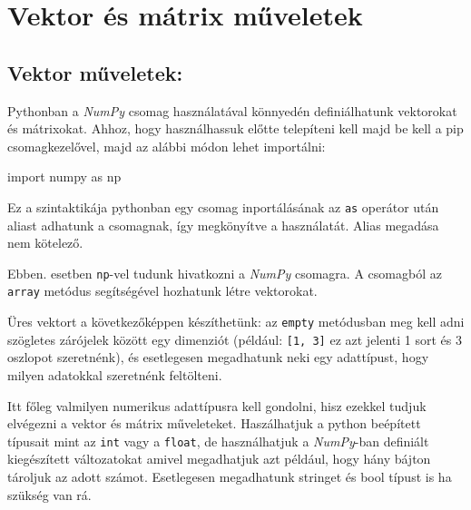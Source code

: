 
\section{Vektor és mátrix
műveletek}\label{vektor-uxe9s-muxe1trix-mux171veletek}

\subsection{Vektor műveletek:}\label{vektor-mux171veletek}

    Pythonban a \emph{NumPy} csomag használatával könnyedén definiálhatunk
vektorokat és mátrixokat. Ahhoz, hogy használhassuk előtte telepíteni
kell majd be kell a pip csomagkezelővel, majd az alábbi módon lehet
importálni:

\begin{python}
import numpy as np
\end{python}

    Ez a szintaktikája pythonban egy csomag inportálásának az \texttt{as}
operátor után aliast adhatunk a csomagnak, így megkönyítve a
használatát. Alias megadása nem kötelező.

    Ebben. esetben \texttt{np}-vel tudunk hivatkozni a \emph{NumPy}
csomagra. A csomagból az \texttt{array} metódus segítségével hozhatunk
létre vektorokat.

\begin{python}

\end{python}


    Üres vektort a következőképpen készíthetünk: az \texttt{empty}
metódusban meg kell adni szögletes zárójelek között egy dimenziót
(például: \texttt{{[}1,\ 3{]}} ez azt jelenti 1 sort és 3 oszlopot
szeretnénk), és esetlegesen megadhatunk neki egy adattípust, hogy milyen
adatokkal szeretnénk feltölteni.

    Itt főleg valmilyen numerikus adattípusra kell gondolni, hisz ezekkel
tudjuk elvégezni a vektor és mátrix műveleteket. Haszálhatjuk a python
beépített típusait mint az \texttt{int} vagy a \texttt{float}, de
használhatjuk a \emph{NumPy}-ban definiált kiegészített változatokat
amivel megadhatjuk azt például, hogy hány bájton tároljuk az adott
számot. Esetlegesen megadhatunk stringet és bool típust is ha szükség
van rá.

\begin{python}

\end{python}

